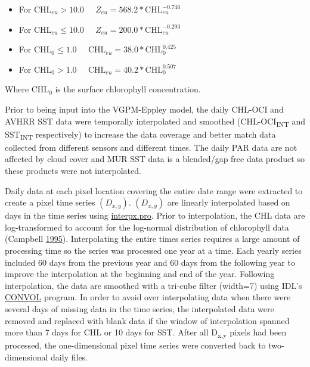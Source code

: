 \documentclass[
]{book}
\providecommand{\tightlist}{%
  \setlength{\itemsep}{0pt}\setlength{\parskip}{0pt}}
\begin{document}
\begin{itemize}
\tightlist
\item
  For \(\textrm{CHL}_{eu} > 10.0\;\;\;\;\;Z_{eu} = 568.2 * \textrm{CHL}_{eu}^{-0.746}\)
\item
  For \(\textrm{CHL}_{eu} \leq 10.0\;\;\;\;\;Z_{eu} = 200.0 * \textrm{CHL}_{eu}^{-0.293}\)
\item
  For \(\textrm{CHL}_{0} \leq 1.0\;\;\;\;\;\textrm{CHL}_{eu} = 38.0 * \textrm{CHL}_{0}^{0.425}\)
\item
  For \(\textrm{CHL}_{0} > 1.0\;\;\;\;\;\textrm{CHL}_{eu} = 40.2 * \textrm{CHL}_{0}^{0.507}\)
\end{itemize}

Where \(\textrm{CHL}_0\) is the surface chlorophyll concentration.

Prior to being input into the VGPM-Eppley model, the daily CHL-OCI and AVHRR SST data were temporally interpolated and smoothed (CHL-OCI\textsubscript{INT} and SST\textsubscript{INT} respectively) to increase the data coverage and better match data collected from different sensors and different times. The daily PAR data are not affected by cloud cover and MUR SST data is a blended/gap free data product so these products were not interpolated.

Daily data at each pixel location covering the entire date range were extracted to create a pixel time series \((D_{x,y})\). \((D_{x,y})\) are linearly interpolated based on days in the time series using \href{https://github.com/callumenator/idl/blob/master/external/JHUAPL/INTERPX.PRO}{interpx.pro}. Prior to interpolation, the CHL data are log-transformed to account for the log-normal distribution of chlorophyll data (Campbell \protect\hyperlink{ref-SOE2}{1995}). Interpolating the entire times series requires a large amount of processing time so the series was processed one year at a time. Each yearly series included 60 days from the previous year and 60 days from the following year to improve the interpolation at the beginning and end of the year. Following interpolation, the data are smoothed with a tri-cube filter (width=7) using IDL's \href{https://www.harrisgeospatial.com/docs/CONVOL.html}{CONVOL} program. In order to avoid over interpolating data when there were several days of missing data in the time series, the interpolated data were removed and replaced with blank data if the window of interpolation spanned more than 7 days for CHL or 10 days for SST. After all D\textsubscript{x,y} pixels had been processed, the one-dimensional pixel time series were converted back to two-dimensional daily files.
\end{document}
